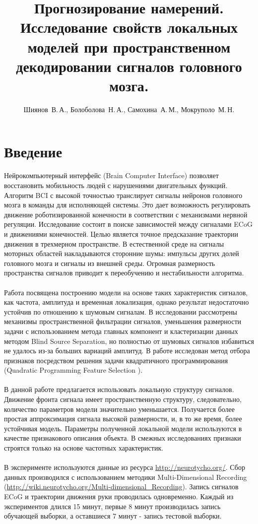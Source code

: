 \documentclass[12pt,twoside]{article}
\title
    [Прогнозирование намерений]
    {Прогнозирование намерений. Исследование свойств локальных моделей при пространственном декодировании сигналов головного мозга.}
\author
    [Болоболова~Н.\,А.]
    {Шиянов~В.\,А., Болоболова~Н.\,А., Самохина~А.\,М., Мокруполо~М.\,Н.}
\begin{document}
\maketitle
\bigskip
\bigskip
\bigskip
\bigskip
\bigskip
\maketitleSecondary

\section{Введение}
Нейрокомпьютерный интерфейс (Brain Computer Interface) позволяет восстановить мобильность людей с нарушениями двигательных функций. Алгоритм BCI с высокой точностью транслирует сигналы нейронов головного мозга в команды для исполняющей системы. Это дает возможность регулировать движение роботизированной конечности в соответствии с механизмами нервной регуляции. Исследование состоит в поиске зависимостей между сигналами ECoG и движениями конечностей. Целью является точное предсказание траектории движения в трехмерном пространстве. В естественной среде на сигналы моторных областей накладываются сторонние шумы: импульсы других долей головного мозга и сигналы из внешней среды. Огромная размерность пространства сигналов приводит к переобучению и нестабильности алгоритма. \\\\
Работа \cite{Eliseyev2014} посвящена построению модели на основе таких характеристик сигналов, как частота, амплитуда и временная локализация, однако результат недостаточно устойчив по отношению к шумовым сигналам. В исследовании \cite{Song2017} рассмотрены механизмы пространственной фильтрации сигналов, уменьшения размерности задачи с использованием метода главных компонент и кластеризации данных методом Blind Source Separation, но полностью от шумовых сигналов избавиться не удалось из-за больших вариаций амплитуд. В работе \cite{Motrenko_2018} исследован метод отбора признаков посредством решения задачи квадратичного программирования (Quadratic Programming Feature Selection \cite{rodriguez2010quadratic}). \\\\
В данной работе предлагается использовать локальную структуру сигналов. Движение фронта сигнала имеет пространственную структуру, следовательно, количество параметров модели значительно уменьшается. Получается более простая аппроксимация сигнала высокой размерности, и, в то же время, более устойчивая модель. Параметры полученной локальной модели используются в качестве признакового описания объекта. В смежных исследованиях признаки строятся только на основе частотных характеристик. \\\\
В эксперименте используются данные из ресурса \url{http://neurotycho.org/}. Сбор данных производился с использованием методики Multi-Dimensional Recording (\url{http://wiki.neurotycho.org/Multi-dimensional_Recording}). Запись сигналов ECoG и траектории движения руки проводилась одновременно. Каждый из экспериментов длился 15 минут, первые 8 минут производилась запись обучающей выборки, а оставшиеся 7 минут - запись тестовой выборки. \\\\
\end{document}
